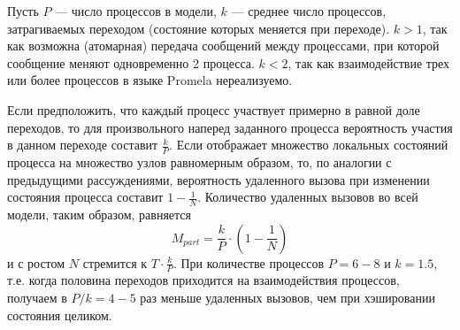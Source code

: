 Пусть $P$ — число процессов в модели, $k$ — среднее число процессов,
затрагиваемых переходом (состояние которых меняется при переходе). $k
> 1$, так как возможна (атомарная) передача сообщений между
процессами, при которой сообщение меняют одновременно 2 процесса. $k <
2$, так как взаимодействие трех или более процессов в языке Promela
нереализуемо.

Если предположить, что каждый процесс участвует примерно в равной доле
переходов, то для произвольного наперед заданного процесса вероятность
участия в данном переходе составит $\frac{k}{P}$. Если
 отображает множество локальных состояний процесса на
множество узлов равномерным образом, то, по аналогии с предыдущими
рассуждениями, вероятность удаленного вызова при изменении состояния
процесса составит $1 - \frac{1}{N}$. Количество удаленных вызовов во
всей модели, таким образом, равняется
\begin{equation}
  \label{eq:nmsg-firstproc-hash}
  M_{part} = \frac{k}{P} \cdot (1 - \frac{1}{N})
\end{equation}
и с ростом $N$ стремится к $T \cdot \frac{k}{P}$. При
количестве процессов $P = 6-8$ и $k = 1.5$, т.е. когда половина переходов
приходится на взаимодействия процессов, получаем в $P/k = 4-5$ раз
меньше удаленных вызовов, чем при хэшировании состояния целиком.

